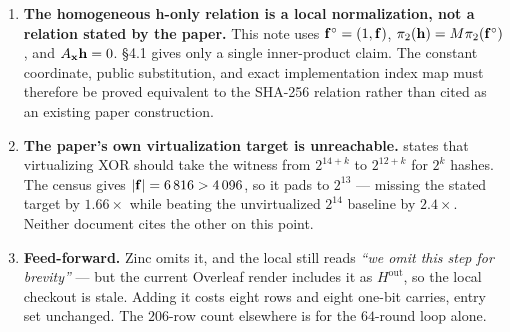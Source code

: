 \begin{enumerate}[leftmargin=1.5em,itemsep=2pt,topsep=4pt]
        $A_{\xx}$ and carrying one constant coordinate.  It does not make $N$
        independent public messages and digests free: the verifier must still
        read them when constructing $A_{\xx}$.  The sent-integer block is
        $\ellcol=2^s$, not $N$.
  \item \textbf{The homogeneous h-only relation is a local normalization, not
        a relation stated by the paper.}  This note uses
        $\mathbf{f}^{\circ}=(1,\mathbf{f})$,
        $\pi_2(\mathbf{h})=M\pi_2(\mathbf{f}^{\circ})$, and
        $A_{\mathbf{x}}\mathbf{h}=0$.  §4.1 gives only a single inner-product claim.  The
        constant coordinate, public substitution, and exact implementation
        index map must therefore be proved equivalent to the SHA-256 relation
        rather than cited as an existing paper construction.
  \item \textbf{The paper's own virtualization target is unreachable.}
         states that virtualizing XOR should take the
        witness from $2^{14+k}$ to $2^{12+k}$ for $2^k$ hashes. The census gives
        $|\mathbf{f}|=6\,816>4\,096$, so it pads to $2^{13}$ --- missing the stated
        target by $1.66\times$ while beating the unvirtualized $2^{14}$ baseline
        by $2.4\times$. Neither document cites the other on this point.
  \item \textbf{Feed-forward.} Zinc\raisebox{0.1ex}{+} omits it, and the local
         still reads \emph{``we omit this step for
        brevity''} --- but the current Overleaf render includes it as
        $H^{\mathrm{out}}$, so the local checkout is stale. Adding it costs eight
        rows and eight one-bit carries, entry set unchanged. The
        $206$-row count elsewhere is for the $64$-round loop alone.
\end{enumerate}
